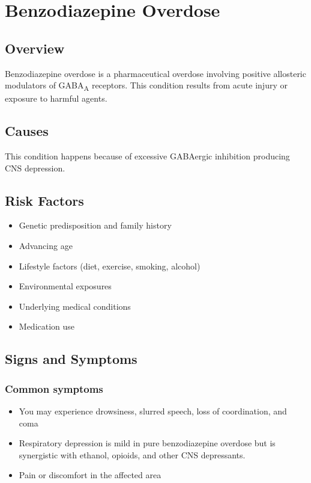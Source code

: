 \chapter{Benzodiazepine Overdose}
\label{sec:Benzodiazepine Overdose}

\section{Overview}
Benzodiazepine overdose is a pharmaceutical overdose involving positive allosteric modulators of GABA\textsubscript{A} receptors. This condition results from acute injury or exposure to harmful agents.
\section{Causes}
This condition happens because of excessive GABAergic inhibition producing CNS depression.     
\section{Risk Factors}

\begin{itemize}[noitemsep]
  \item Genetic predisposition and family history
  \item Advancing age
  \item Lifestyle factors (diet, exercise, smoking, alcohol)
  \item Environmental exposures
  \item Underlying medical conditions
  \item Medication use
\end{itemize}
\section{Signs and Symptoms}

\subsection{Common symptoms}
\begin{itemize}[noitemsep]
  \item You may experience drowsiness, slurred speech, loss of coordination, and coma
  \item Respiratory depression is mild in pure benzodiazepine overdose but is synergistic with ethanol, opioids, and other CNS depressants.
  \item Pain or discomfort in the affected area
  \end{itemize}

